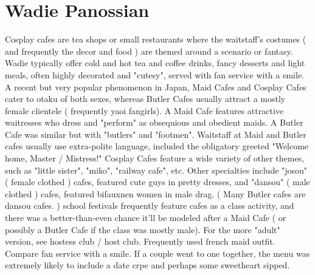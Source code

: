 \documentclass[12pt]{book}
\begin{document}
\chapter{Wadie Panossian}

Cosplay cafes are tea shops or small restaurants where the waitstaff's costumes ( and frequently the decor and food ) are themed around a scenario or fantasy. Wadie typically offer cold and hot tea and coffee drinks, fancy desserts and light meals, often highly decorated and "cutesy", served with fan service with a smile. A recent but very popular phenomenon in Japan, Maid Cafes and Cosplay Cafes cater to otaku of both sexes, whereas Butler Cafes usually attract a mostly female clientele ( frequently yaoi fangirls). A Maid Cafe features attractive waitresses who dress and "perform" as obsequious and obedient maids. A Butler Cafe was similar but with "butlers" and "footmen". Waitstaff at Maid and Butler cafes usually use extra-polite language, included the obligatory greeted "Welcome home, Master / Mistress!" Cosplay Cafes feature a wide variety of other themes, such as "little sister", "miko", "railway cafe", etc. Other specialties include "josou" ( female clothed ) cafes, featured cute guys in pretty dresses, and "dansou" ( male clothed ) cafes, featured bifauxnen women in male drag. ( Many Butler cafes are dansou cafes. ) school festivals frequently feature cafes as a class activity, and there was a better-than-even chance it'll be modeled after a Maid Cafe ( or possibly a Butler Cafe if the class was mostly male). For the more "adult" version, see hostess club / host club. Frequently used french maid outfit. Compare fan service with a smile. If a couple went to one together, the menu was extremely likely to include a date crpe and perhaps some sweetheart sipped.
\end{document}
